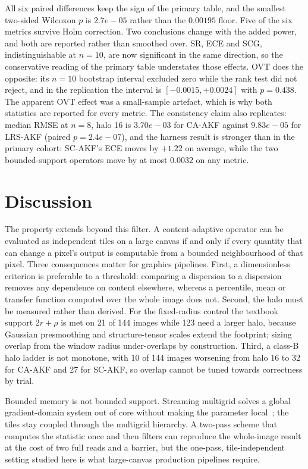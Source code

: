 \documentclass[journal]{IEEEtran}
\begin{document}
All six paired differences keep the sign of the primary table, and the smallest two-sided Wilcoxon \(p\) is \(2.7e-05\) rather than the \(0.00195\) floor. Five of the six metrics survive Holm correction. Two conclusions change with the added power, and both are reported rather than smoothed over. SR, ECE and SCG, indistinguishable at \(n=10\), are now significant in the same direction, so the conservative reading of the primary table understates those effects. OVT does the opposite: its \(n=10\) bootstrap interval excluded zero while the rank test did not reject, and in the replication the interval is \([-0.0015, +0.0024]\) with \(p=0.438\). The apparent OVT effect was a small-sample artefact, which is why both statistics are reported for every metric. The consistency claim also replicates: median RMSE at \(n=8\), halo 16 is \(3.70e-03\) for CA-AKF against \(9.83e-05\) for LRS-AKF (paired \(p=2.4e-07\)), and the harness result is stronger than in the primary cohort: SC-AKF's ECE moves by \(+1.22\) on average, while the two bounded-support operators move by at most \(0.0032\) on any metric.

\section{Discussion}\label{sec:discussion}

The property extends beyond this filter. A content-adaptive operator can be evaluated as independent tiles on a large canvas if and only if every quantity that can change a pixel's output is computable from a bounded neighbourhood of that pixel. Three consequences matter for graphics pipelines. First, a dimensionless criterion is preferable to a threshold: comparing a dispersion to a dispersion removes any dependence on content elsewhere, whereas a percentile, mean or transfer function computed over the whole image does not. Second, the halo must be measured rather than derived. For the fixed-radius control the textbook support \(2r+\rho\) is met on 21 of 144 images while 123 need a larger halo, because Gaussian presmoothing and structure-tensor scales extend the footprint; sizing overlap from the window radius under-overlaps by construction. Third, a class-B halo ladder is not monotone, with 10 of 144 images worsening from halo 16 to 32 for CA-AKF and 27 for SC-AKF, so overlap cannot be tuned towards correctness by trial.

Bounded memory is not bounded support. Streaming multigrid solves a global gradient-domain system out of core without making the parameter local~\cite{kazhdan2008smg}; the tiles stay coupled through the multigrid hierarchy. A two-pass scheme that computes the statistic once and then filters can reproduce the whole-image result at the cost of two full reads and a barrier, but the one-pass, tile-independent setting studied here is what large-canvas production pipelines require.
\end{document}
